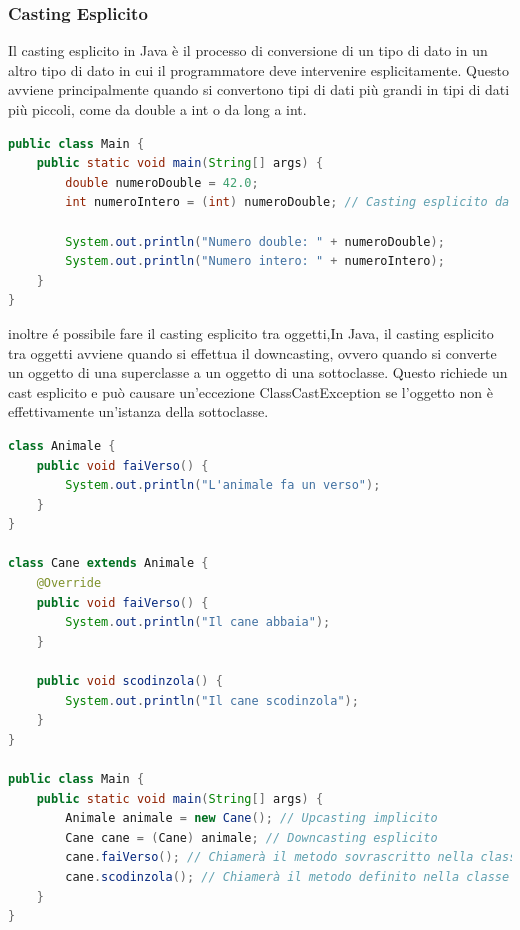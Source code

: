 \documentclass[11pt]{article}
\begin{document}
    \subsubsection{Casting Esplicito}
    Il casting esplicito in Java è il processo di conversione di un tipo di dato in un altro tipo di dato in cui il programmatore deve intervenire esplicitamente. Questo avviene principalmente quando si convertono tipi di dati più grandi in tipi di dati più piccoli, come da double a int o da long a int.
    \begin{lstlisting}[language=Java]
public class Main {
    public static void main(String[] args) {
        double numeroDouble = 42.0;
        int numeroIntero = (int) numeroDouble; // Casting esplicito da double a int

        System.out.println("Numero double: " + numeroDouble);
        System.out.println("Numero intero: " + numeroIntero);
    }
}
    \end{lstlisting}
    inoltre é possibile fare il casting esplicito tra oggetti,In Java, il casting esplicito tra oggetti avviene quando si effettua il downcasting, ovvero quando si converte un oggetto di una superclasse a un oggetto di una sottoclasse. Questo richiede un cast esplicito e può causare un'eccezione ClassCastException se l'oggetto non è effettivamente un'istanza della sottoclasse.
    \begin{lstlisting}[language=Java]
class Animale {
    public void faiVerso() {
        System.out.println("L'animale fa un verso");
    }
}

class Cane extends Animale {
    @Override
    public void faiVerso() {
        System.out.println("Il cane abbaia");
    }

    public void scodinzola() {
        System.out.println("Il cane scodinzola");
    }
}

public class Main {
    public static void main(String[] args) {
        Animale animale = new Cane(); // Upcasting implicito
        Cane cane = (Cane) animale; // Downcasting esplicito
        cane.faiVerso(); // Chiamerà il metodo sovrascritto nella classe Cane
        cane.scodinzola(); // Chiamerà il metodo definito nella classe Cane
    }
}
    \end{lstlisting}
\end{document}
